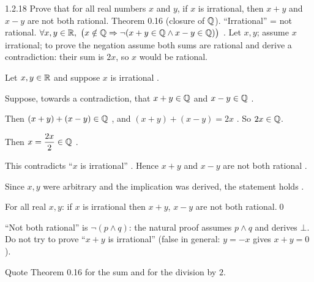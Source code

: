 \begin{bookex}[essential]{1.2.18}
Prove that for all real numbers $x$ and $y$, if $x$ is irrational, then $x+y$ and $x-y$ are not both rational.
\solution
\given Theorem 0.16 (closure of $\mathbb{Q}$). ``Irrational'' = not rational.
\goal $\forall x,y\in\R,\ \big(x\notin\Q\Rightarrow\neg(x+y\in\Q\wedge x-y\in\Q)\big)$ .
\plan Let $x,y$; assume $x$ irrational; to prove the negation assume both sums are rational and derive a contradiction: their sum is $2x$, so $x$ would be rational.
\begin{steps}
\item Let $x,y\in\mathbb{R}$  and suppose $x$ is irrational .
\item Suppose, towards a contradiction, that $x+y\in\mathbb{Q}$ and $x-y\in\mathbb{Q}$ .
\item Then $(x+y)+(x-y)\in\mathbb{Q}$ , and $(x+y)+(x-y)=2x$ . So $2x\in\mathbb{Q}$.
\item Then $x=\dfrac{2x}{2}\in\mathbb{Q}$ .
\item This contradicts ``$x$ is irrational'' . Hence $x+y$ and $x-y$ are not both rational .
\item Since $x,y$ were arbitrary and the implication was derived, the statement holds .
\end{steps}
\conclusion For all real $x,y$: if $x$ is irrational then $x+y$, $x-y$ are not both rational.\qed
\begin{compare}
\item ``Not both rational'' is $\neg(p\wedge q)$: the natural proof assumes $p\wedge q$ and derives $\bot$. Do not try to prove ``$x+y$ is irrational'' (false in general: $y=-x$ gives $x+y=0$).
\item Quote Theorem 0.16 for the sum and for the division by $2$.
\end{compare}
\end{bookex}

